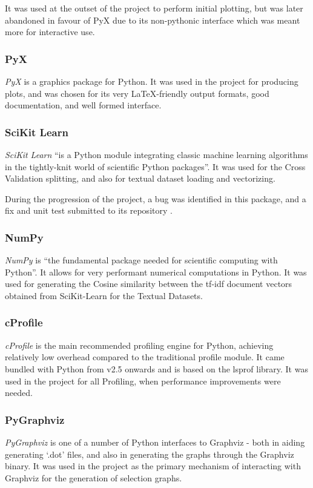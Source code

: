 \documentclass[a4paper,11pt]{report}
\begin{document}
It was used at the outset of the project to perform initial plotting, but was later abandoned in favour of PyX due to its non-pythonic interface which was meant more for interactive use.

\subsubsection*{PyX}
\emph{PyX} \citep{prog:pyx} is a graphics package for Python. It was used in the project for producing plots, and was chosen for its very \LaTeX{}-friendly output formats, good documentation, and well formed interface.

\subsubsection*{SciKit Learn}
\emph{SciKit Learn} \citep{prog:sklearn} ``is a Python module integrating classic machine learning algorithms in the tightly-knit world of scientific Python packages''. It was used for the Cross Validation splitting, and also for textual dataset loading and vectorizing.

During the progression of the project, a bug was identified in this package, and a fix and unit test submitted to its repository \citep{web:scikitpullreq}.

\subsubsection*{NumPy}
\emph{NumPy} \citep{prog:numpy} is ``the fundamental package needed for scientific computing with Python''. It allows for very performant numerical computations in Python. It was used for generating the Cosine similarity between the tf-idf document vectors obtained from SciKit-Learn for the Textual Datasets.
 
\subsubsection*{cProfile}
\emph{cProfile} \citep{prog:cprofile} is the main recommended profiling engine for Python, achieving relatively low overhead compared to the traditional profile module. It came bundled with Python from v2.5 onwards and is based on the lsprof \citep{prog:lsprof} library. It was used in the project for all Profiling, when performance improvements were needed.

\subsubsection*{PyGraphviz}
\emph{PyGraphviz} \citep{prog:pygraphviz} is one of a number of Python interfaces to Graphviz - both in aiding generating `.dot' files, and also in generating the graphs through the Graphviz binary. It was used in the project as the primary mechanism of interacting with Graphviz for the generation of selection graphs. 
\end{document}
